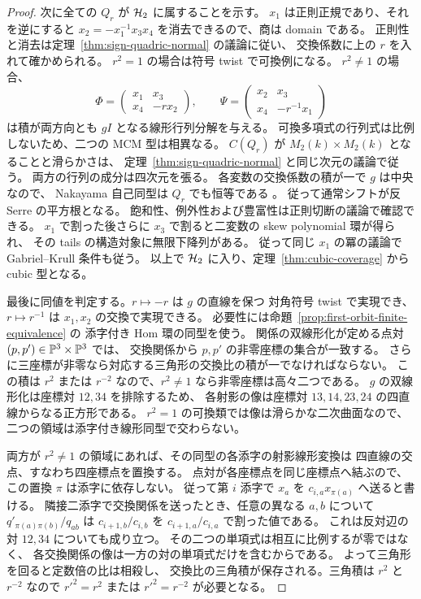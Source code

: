 \begin{proof}
次に全ての $Q_r$ が $\mathcal H_2$ に属することを示す。
$x_1$ は正則正規であり、それを逆にすると
$x_2=-x_1^{-1}x_3x_4$ を消去できるので、商は domain である。
正則性と消去は定理~\ref{thm:sign-quadric-normal} の議論に従い、
交換係数に上の $r$ を入れて確かめられる。
$r^2=1$ の場合は符号 twist で可換例になる。
$r^2\ne1$ の場合、
\[
 \Phi=\begin{pmatrix}x_1&x_3\\x_4&-r x_2\end{pmatrix},\qquad
 \Psi=\begin{pmatrix}x_2&x_3\\x_4&-r^{-1}x_1\end{pmatrix}
\]
は積が両方向とも $gI$ となる線形行列分解を与える。
可換多項式の行列式は比例しないため、二つの MCM 型は相異なる。
$C(Q_r)$ が $M_2(k)\times M_2(k)$ となることと滑らかさは、
定理~\ref{thm:sign-quadric-normal} と同じ次元の議論で従う。
両方の行列の成分は四次元を張る。
各変数の交換係数の積が一で $g$ は中央なので、
Nakayama 自己同型は $Q_r$ でも恒等である
\cite[Example 5.5 and Lemma 1.5]{RRZ2014}。
従って通常シフトが反 Serre の平方根となる。
飽和性、例外性および豊富性は正則切断の議論で確認できる。
$x_1$ で割った後さらに $x_3$ で割ると二変数の skew polynomial 環が得られ、
その tails の構造対象に無限下降列がある。
従って同じ $x_1$ の冪の議論で Gabriel--Krull 条件も従う。
以上で $\mathcal H_2$ に入り、定理~\ref{thm:cubic-coverage} から cubic 型となる。

最後に同値を判定する。$r\mapsto-r$ は $g$ の直線を保つ
対角符号 twist で実現でき、$r\mapsto r^{-1}$ は $x_1,x_2$ の交換で実現できる。
必要性には命題~\ref{prop:first-orbit-finite-equivalence} の
添字付き Hom 環の同型を使う。
関係の双線形化が定める点対 $(p,p')\in\mathbb P^3\times\mathbb P^3$ では、
交換関係から $p,p'$ の非零座標の集合が一致する。
さらに三座標が非零なら対応する三角形の交換比の積が一でなければならない。
この積は $r^2$ または $r^{-2}$ なので、$r^2\ne1$ なら非零座標は高々二つである。
$g$ の双線形化は座標対 $12,34$ を排除するため、
各射影の像は座標対 $13,14,23,24$ の四直線からなる正方形である。
$r^2=1$ の可換類では像は滑らかな二次曲面なので、
二つの領域は添字付き線形同型で交わらない。

両方が $r^2\ne1$ の領域にあれば、その同型の各添字の射影線形変換は
四直線の交点、すなわち四座標点を置換する。
点対が各座標点を同じ座標点へ結ぶので、この置換 $\pi$ は添字に依存しない。
従って第 $i$ 添字で $x_a$ を $c_{i,a} x_{\pi(a)}$ へ送ると書ける。
隣接二添字で交換関係を送ったとき、任意の異なる $a,b$ について
$q'_{\pi(a)\pi(b)}/q_{ab}$ は
$c_{i+1,b}/c_{i,b}$ を $c_{i+1,a}/c_{i,a}$ で割った値である。
これは反対辺の対 $12,34$ についても成り立つ。
その二つの単項式は相互に比例するが零ではなく、
各交換関係の像は一方の対の単項式だけを含むからである。
よって三角形を回ると定数倍の比は相殺し、
交換比の三角積が保存される。三角積は $r^2$ と $r^{-2}$ なので
$r'^2=r^2$ または $r'^2=r^{-2}$ が必要となる。
\end{proof}
